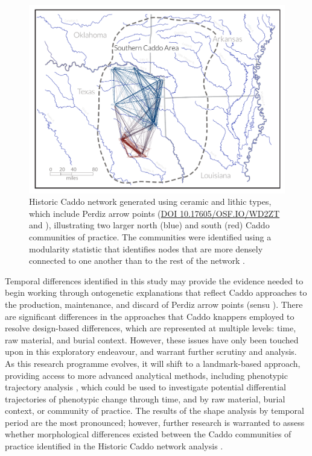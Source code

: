 \documentclass[review]{elsarticle}
\begin{document}
\begin{figure}[h!]\centering
\includegraphics[width=\linewidth]{fig.net.pdf}
\caption{Historic Caddo network generated using ceramic and lithic types, which include Perdiz arrow points (\href{https://osf.io/wd2zt/}{DOI 10.17605/OSF.IO/WD2ZT} and \citealt{RN8031}), illustrating two larger north (blue) and south (red) Caddo communities of practice. The communities were identified using a modularity statistic that identifies nodes that are more densely connected to one another than to the rest of the network \citep{RN8051,RN8024}.}
\label{fig:fig.net}
\end{figure}

Temporal differences identified in this study may provide the evidence needed to begin working through ontogenetic explanations that reflect Caddo approaches to the production, maintenance, and discard of Perdiz arrow points (sensu \citealt{RN5871}). There are significant differences in the approaches that Caddo knappers employed to resolve design-based differences, which are represented at multiple levels: time, raw material, and burial context. However, these issues have only been touched upon in this exploratory endeavour, and warrant further scrutiny and analysis. As this research programme evolves, it will shift to a landmark-based approach, providing access to more advanced analytical methods, including phenotypic trajectory analysis \citep{RN8352,RN8561,RN8544,RN8560}, which could be used to investigate potential differential trajectories of phenotypic change through time, and by raw material, burial context, or community of practice. The results of the shape analysis by temporal period are the most pronounced; however, further research is warranted to assess whether morphological differences existed between the Caddo communities of practice identified in the Historic Caddo network analysis \citep{RN8031}.
\end{document}
